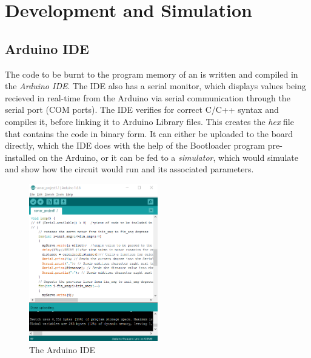 \chapter{Development and Simulation}\label{ch:ch2label}
\section{Arduino IDE}
The code to be burnt to the program memory of an \arduino{} is written and compiled in the \emph{Arduino IDE}. The IDE also has a serial monitor, which displays values being recieved in real-time from the Arduino via serial communication through the serial port (COM ports). The IDE verifies for correct C/C++ syntax and compiles it, before linking it to Arduino Library files. This creates the \textit{hex} file that contains the code in binary form. It can either be uploaded to the board directly, which the IDE does with the help of the Bootloader program pre-installed on the Arduino, or it can be fed to a \emph{simulator}, which would simulate and show how the circuit would run and its associated parameters.
\begin{figure}[H]
	\vfill
	\centering
	\includegraphics[width=0.5\textwidth]{../Files/IDE}
	\caption{The Arduino IDE}  \label{fig:IDE}
\end{figure}


\clearpage
